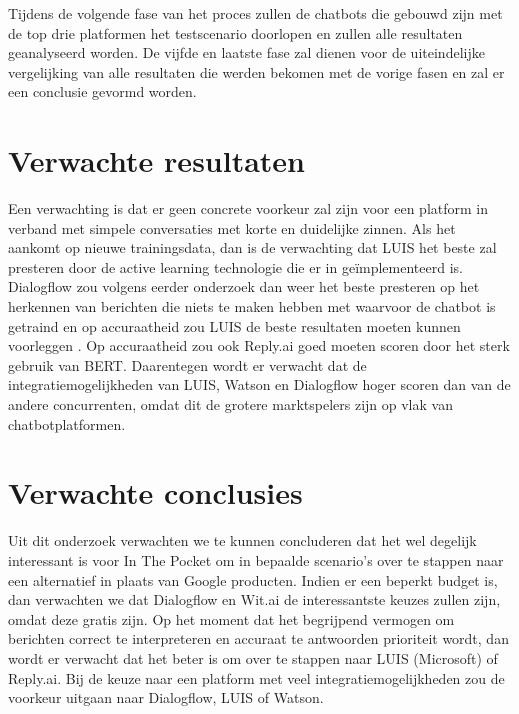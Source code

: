 \bigskip
Tijdens de volgende fase van het proces zullen de chatbots die gebouwd zijn met de top drie platformen het testscenario doorlopen en zullen alle resultaten geanalyseerd worden.
De vijfde en laatste fase zal dienen voor de uiteindelijke vergelijking van alle resultaten die werden bekomen met de vorige fasen en zal er een conclusie gevormd worden.


\section{Verwachte resultaten}
\label{sec:verwachte_resultaten} 

Een verwachting is dat er geen concrete voorkeur zal zijn voor een platform in verband met simpele conversaties met korte en duidelijke zinnen. Als het aankomt op nieuwe trainingsdata, dan is de verwachting dat LUIS het beste zal presteren door de active learning technologie die er in geïmplementeerd is. Dialogflow zou volgens eerder onderzoek dan weer het beste presteren op het herkennen van berichten die niets te maken hebben met waarvoor de chatbot is getraind en op accuraatheid zou LUIS de beste resultaten moeten kunnen voorleggen \autocite{Russis2018}. Op accuraatheid zou ook Reply.ai goed moeten scoren door het sterk gebruik van BERT. Daarentegen wordt er verwacht dat de integratiemogelijkheden van LUIS, Watson en Dialogflow hoger scoren dan van de andere concurrenten, omdat dit de grotere marktspelers zijn op vlak van chatbotplatformen.

\section{Verwachte conclusies}
\label{sec:verwachte_conclusies}

Uit dit onderzoek verwachten we te kunnen concluderen dat het wel degelijk interessant is voor In The Pocket om in bepaalde scenario’s over te stappen naar een alternatief in plaats van Google producten. Indien er een beperkt budget is, dan verwachten we dat Dialogflow en Wit.ai de interessantste keuzes zullen zijn, omdat deze gratis zijn. Op het moment dat het begrijpend vermogen om berichten correct te interpreteren en accuraat te antwoorden prioriteit wordt, dan wordt er verwacht dat het beter is om over te stappen naar LUIS (Microsoft) of Reply.ai. Bij de keuze naar een platform met veel integratiemogelijkheden zou de voorkeur uitgaan naar Dialogflow, LUIS of Watson.

